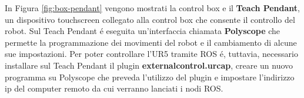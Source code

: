 In Figura \ref{fig:box-pendant} vengono mostrati la control box e il \textbf{Teach Pendant}, un dispositivo touchscreen collegato 
alla control box che consente il controllo del robot. Sul Teach Pendant \'{e} eseguita un'interfaccia chiamata \textbf{Polyscope} 
che permette la programmazione dei movimenti del robot e il cambiamento di alcune sue impostazioni. 
Per poter controllare l'UR5 tramite ROS \'{e}, tuttavia, necessario installare sul Teach Pendant il plugin \textbf{externalcontrol.urcap}, 
creare un nuovo programma su Polyscope che preveda l'utilizzo del plugin e impostare l'indirizzo ip del computer remoto da cui 
verranno lanciati i nodi ROS.

